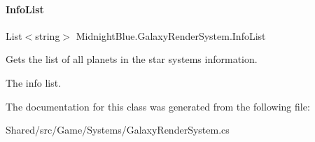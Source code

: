 \paragraph{\texorpdfstring{Info\+List}{InfoList}}
{\footnotesize\ttfamily List$<$string$>$ Midnight\+Blue.\+Galaxy\+Render\+System.\+Info\+List\hspace{0.3cm}{\ttfamily [get]}}



Gets the list of all planets in the star system\textquotesingle{}s information. 

The info list.

The documentation for this class was generated from the following file\+:\begin{DoxyCompactItemize}
\item 
Shared/src/\+Game/\+Systems/Galaxy\+Render\+System.\+cs\end{DoxyCompactItemize}

